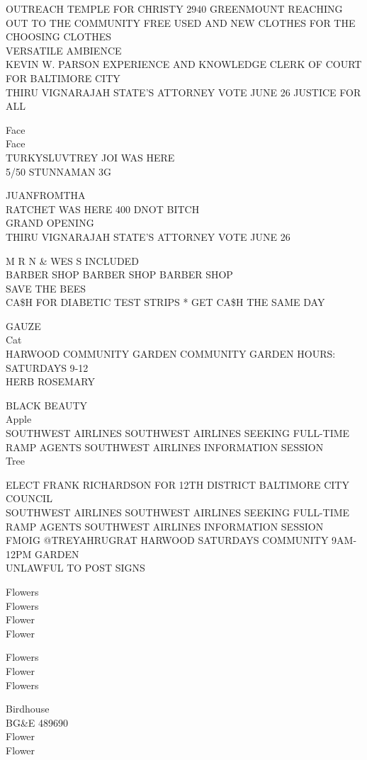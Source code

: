 \documentclass[10pt,letterpaper]{article}
\begin{document}
OUTREACH TEMPLE FOR CHRISTY 2940 GREENMOUNT REACHING OUT TO THE COMMUNITY FREE USED AND NEW CLOTHES FOR THE CHOOSING CLOTHES\\
VERSATILE AMBIENCE\\
KEVIN W. PARSON EXPERIENCE AND KNOWLEDGE CLERK OF COURT FOR BALTIMORE CITY\\
THIRU VIGNARAJAH STATE'S ATTORNEY VOTE JUNE 26 JUSTICE FOR ALL

Face\\
Face\\
TURKYSLUVTREY JOI WAS HERE\\
5/50 STUNNAMAN 3G

JUANFROMTHA\\
RATCHET WAS HERE 400 DNOT BITCH\\
GRAND OPENING\\
THIRU VIGNARAJAH STATE'S ATTORNEY VOTE JUNE 26

M R N \& WES S INCLUDED\\
BARBER SHOP BARBER SHOP BARBER SHOP\\
SAVE THE BEES\\
CA\$H FOR DIABETIC TEST STRIPS * GET CA\$H THE SAME DAY

GAUZE\\
Cat\\
HARWOOD COMMUNITY GARDEN COMMUNITY GARDEN HOURS: SATURDAYS 9{-}12\\
HERB ROSEMARY

BLACK BEAUTY\\
Apple\\
SOUTHWEST AIRLINES SOUTHWEST AIRLINES SEEKING FULL{-}TIME RAMP AGENTS SOUTHWEST AIRLINES INFORMATION SESSION\\
Tree

ELECT FRANK RICHARDSON FOR 12TH DISTRICT BALTIMORE CITY COUNCIL\\
SOUTHWEST AIRLINES SOUTHWEST AIRLINES SEEKING FULL{-}TIME RAMP AGENTS SOUTHWEST AIRLINES INFORMATION SESSION\\
FMOIG @TREYAHRUGRAT HARWOOD SATURDAYS COMMUNITY 9AM{-}12PM GARDEN\\
UNLAWFUL TO POST SIGNS

Flowers\\
Flowers\\
Flower\\
Flower

Flowers\\
Flower\\
Flowers

Birdhouse\\
BG\&E 489690\\
Flower\\
Flower
\end{document}
